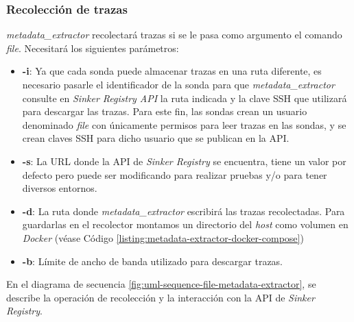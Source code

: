 \subsubsection{Recolección de trazas}

\emph{metadata\_extractor} recolectará trazas si se le pasa como argumento el comando \emph{file}. Necesitará los siguientes
parámetros:

\begin{itemize}
    \item \textbf{-i}: Ya que cada sonda puede almacenar trazas en una ruta diferente, es necesario pasarle el 
                       identificador de la sonda para que \emph{metadata\_extractor} consulte en \emph{Sinker Registry API}
                       la ruta indicada y la clave SSH que utilizará para descargar las trazas. Para este fin,
                       las sondas crean un usuario denominado \emph{file} con únicamente permisos para leer trazas en las sondas, y
                       se crean claves SSH para dicho usuario que se publican en la API.
    \item \textbf{-s}: La URL donde la API de \emph{Sinker Registry} se encuentra, tiene un valor por defecto pero puede ser modificando
                       para realizar pruebas y/o para tener diversos entornos.
    \item \textbf{-d}: La ruta donde \emph{metadata\_extractor} escribirá las trazas recolectadas. Para guardarlas en el recolector
                       montamos un directorio del \emph{host} como volumen en \emph{Docker} (véase Código \ref{listing:metadata-extractor-docker-compose})
    \item \textbf{-b}: Límite de ancho de banda utilizado para descargar trazas.
\end{itemize}

En el diagrama de secuencia \ref{fig:uml-sequence-file-metadata-extractor}, se describe la operación de recolección y la interacción con la API de \emph{Sinker Registry}.

